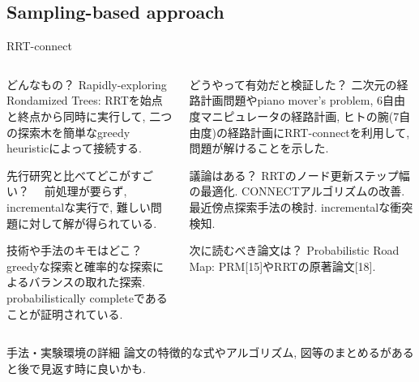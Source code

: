 \documentclass[8pt, dvipdfmx]{beamer}
\begin{document}
\subsection{Sampling-based approach}
\begin{frame}{RRT-connect \cite{RRT-connect}}
    \begin{columns}[t]
        \begin{column}{0.5\textwidth}
          \begin{block}{どんなもの？}
            Rapidly-exploring Rondamized Trees: RRTを始点と終点から同時に実行して, 二つの探索木を簡単なgreedy heuristicによって接続する.
          \end{block}
          \begin{block}{先行研究と比べてどこがすごい？}
          　前処理が要らず, incrementalな実行で, 難しい問題に対して解が得られている.
          \end{block}
          \begin{block}{技術や手法のキモはどこ？}
            greedyな探索と確率的な探索によるバランスの取れた探索. probabilistically completeであることが証明されている.
          \end{block}
        \end{column}
        \begin{column}{0.5\textwidth}
          \begin{block}{どうやって有効だと検証した？}
            二次元の経路計画問題やpiano mover's problem, 6自由度マニピュレータの経路計画, ヒトの腕(7自由度)の経路計画にRRT-connectを利用して, 問題が解けることを示した.
          \end{block}
          \begin{block}{議論はある？}
            RRTのノード更新ステップ幅の最適化. CONNECTアルゴリズムの改善. 最近傍点探索手法の検討. incrementalな衝突検知.
          \end{block}
          \begin{block}{次に読むべき論文は？}
            Probabilistic Road Map: PRM[15]やRRTの原著論文[18].
          \end{block}
        \end{column}
    \end{columns}
\end{frame}

\begin{frame}{手法・実験環境の詳細}
論文の特徴的な式やアルゴリズム, 図等のまとめるがあると後で見返す時に良いかも.
\end{frame}
\end{document}
